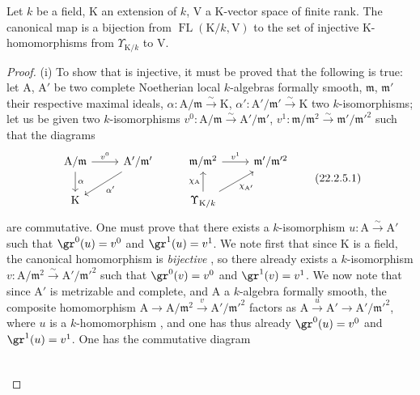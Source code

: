 \begin{proposition}[22.2.5]
\label{0.22.2.5}
Let $k$ be a field, $\mathrm{K}$ an extension of $k$, $\mathrm{V}$ a $\mathrm{K}$-vector space of finite rank.
The canonical map  is a bijection from $\operatorname{FL}(\mathrm{K}/k,\mathrm{V})$ to the set of injective $\mathrm{K}$-homomorphisms from $\Upsilon_{\mathrm{K}/k}$ to $\mathrm{V}$.
\end{proposition}

\begin{proof}
(i) To show that  is injective, it must be proved that the following is true: let $\mathrm{A}$, $\mathrm{A}'$ be two complete Noetherian local $k$-algebras formally smooth, $\mathfrak{m}$, $\mathfrak{m}'$ their respective maximal ideals, $\alpha:\mathrm{A}/\mathfrak{m}\xrightarrow{\sim}\mathrm{K}$, $\alpha':\mathrm{A}'/\mathfrak{m}'\xrightarrow{\sim}\mathrm{K}$ two $k$-isomorphisms; let us be given two $k$-isomorphisms $v^0:\mathrm{A}/\mathfrak{m}\xrightarrow{\sim}\mathrm{A}'/\mathfrak{m}'$, $v^1:\mathfrak{m}/\mathfrak{m}^2\xrightarrow{\sim}\mathfrak{m}'/\mathfrak{m}'^2$ such that the diagrams
\[
\label{0.22.2.5.1}
  \begin{tikzcd}
    \mathrm{A}/\mathfrak{m} \ar[r,"v^0"] \ar[d,"\alpha"] & \mathrm{A}'/\mathfrak{m}' \ar[dl,"\alpha'"] & \mathfrak{m}/\mathfrak{m}^2 \ar[r,"v^1"] & \mathfrak{m}'/\mathfrak{m}'^2\\
    \mathrm{K} & & \Upsilon_{\mathrm{K}/k} \ar[u,"\chi_\mathrm{A}"] \ar[ur,"\chi_{\mathrm{A}'}"'] &
  \end{tikzcd}
  \tag{22.2.5.1}
\]
are commutative.
One must prove that there exists a $k$-isomorphism $u:\mathrm{A}\xrightarrow{\sim}\mathrm{A}'$ such that $\gr^0(u)=v^0$ and $\gr^1(u)=v^1$.
We note first that since $\mathrm{K}$ is a field, the canonical homomorphism  is \emph{bijective} , so there already exists a $k$-isomorphism $v:\mathrm{A}/\mathfrak{m}^2\xrightarrow{\sim}\mathrm{A}'/\mathfrak{m}'^2$ such that $\gr^0(v)=v^0$ and $\gr^1(v)=v^1$.
We now note that since $\mathrm{A}'$ is metrizable and complete, and $\mathrm{A}$ a $k$-algebra formally smooth, the composite homomorphism $\mathrm{A}\to\mathrm{A}/\mathfrak{m}^2\xrightarrow{v}\mathrm{A}'/\mathfrak{m}'^2$ factors as $\mathrm{A}\xrightarrow{u}\mathrm{A}'\to\mathrm{A}'/\mathfrak{m}'^2$, where $u$ is a $k$-homomorphism , and one has thus already $\gr^0(u)=v^0$ and $\gr^1(u)=v^1$.
One has the commutative diagram
\[
  \begin{tikzcd}

\end{tikzcd}\]
\end{proof}
